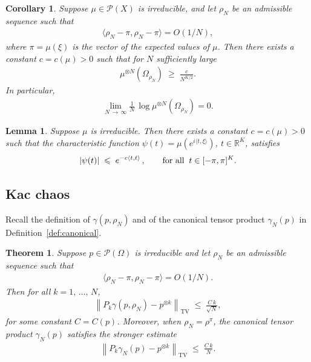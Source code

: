 \documentclass[10pt,a4paper]{article}
\newtheorem{theo}[theorem]{Theorem}
\newtheorem{lemm}[theorem]{Lemma}
\newtheorem{coro}[theorem]{Corollary}
\renewcommand{\leq}{\;\leqslant\;}
\renewcommand{\geq}{\;\geqslant\;}
\newcommand{\Om}{\Omega}
\newcommand{\rhoN}{\rho^{\pi}}
\newcommand{\scalar}[2]{\langle #1, #2\rangle}
\newcommand{\tv}{\mathrm{TV}}
\newcommand{\cP}{\mathcal{P}}
\newcommand{\bbR}{\mathbb{R}}
\let\g=\gamma
\let\r=\rho
\let\O=\Omega
\begin{document}
\begin{coro}\label{coro2}
Suppose $\mu\in\cP(X)$ is irreducible, and let $\r_N$ be an admissible sequence such that
\begin{align}\label{hypo1}
\scalar{\r_N-\pi}{\r_N-\pi} =O(1/N),
\end{align}
where $\pi = \mu(\xi)$ is the vector of the expected values of $\mu$. Then there exists a constant $c=c(\mu)>0$ such that for $N$ sufficiently large
\begin{align}\label{lim1}
\mu^{\otimes N}\left(\Om_{\r_N}\right)\geq \frac{c}{N^{K/2}}.
\end{align}
In particular,
\begin{align}\label{loglim}
\lim_{N\,\to\,\infty} \frac1N\,\log
\mu^{\otimes N}\left(\Om_{\r_N}\right)= 0.
\end{align}
\end{coro}

\begin{lemm}\label{charfunc}
Suppose $\mu$ is irreducible. Then there exists a constant $c=c(\mu)>0$ such that the characteristic function $\psi(t)=\mu(e^{i\scalar{t}{\xi}})$, $t\in\bbR^K$, satisfies
\begin{align*}
|\psi(t)|\leq e^{-c
\scalar{t}{t} }\,,\qquad \text{for all\;\;} t\in[-\pi,\pi]^K.
\end{align*}
\end{lemm}

\subsection{Kac chaos}

Recall the definition of $\g(p,\r_N)$ and of the canonical tensor product $\g_N(p)$ in Definition~\ref{def:canonical}.

\begin{theo}\label{th:eqens}
Suppose $p\in\cP(\O)$ is irreducible and let $\r_N$ be an admissible sequence such that
\begin{align}\label{hypo10}
\scalar{\r_N-\pi}{\r_N-\pi} =O(1/N).
\end{align}
Then for all $k=1,\,\dots,\,N$,
\begin{align}\label{eq:chaos00}
\left\|P_k\g(p,\r_N)-p^{\otimes k}\right\|_\tv \leq \frac{C\,k}{\sqrt N},
\end{align}
for some constant $C=C(p)$. Moreover, when $\r_N=\rhoN$, the canonical tensor product $\g_N(p)$ satisfies the stronger estimate
\begin{align}\label{eq:chaos000}
\left\|P_k\g_N(p)-p^{\otimes k}\right\|_\tv \leq \frac{C\,k}{ N}.
\end{align}
\end{theo}
\end{document}
